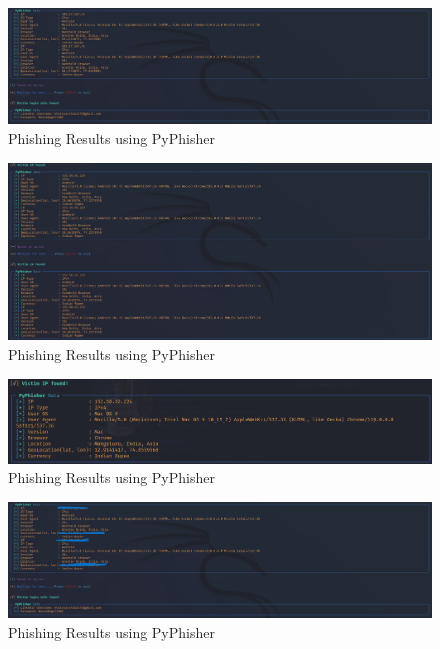 \documentclass[openany]{report}
\begin{document}
\begin{figure}[H]
    \centering
    \includegraphics[width=.95\textwidth]{phishing images/anshika.png}
    \caption{Phishing Results using PyPhisher}
    \label{fig:implementation_1}
\end{figure}

\begin{figure}[H]
    \centering
    \includegraphics[width=.95\textwidth]{phishing images/kaif.png}
    \caption{Phishing Results using PyPhisher}
    \label{fig:implementation_1}
\end{figure}

\begin{figure}[H]
    \centering
    \includegraphics[width=.95\textwidth]{phishing images/naman.png}
    \caption{Phishing Results using PyPhisher}
    \label{fig:implementation_1}
\end{figure}

\begin{figure}[H]
    \centering
    \includegraphics[width=.95\textwidth]{phishing images/victim1.png}
    \caption{Phishing Results using PyPhisher}
    \label{fig:implementation_1}
\end{figure}
\end{document}
